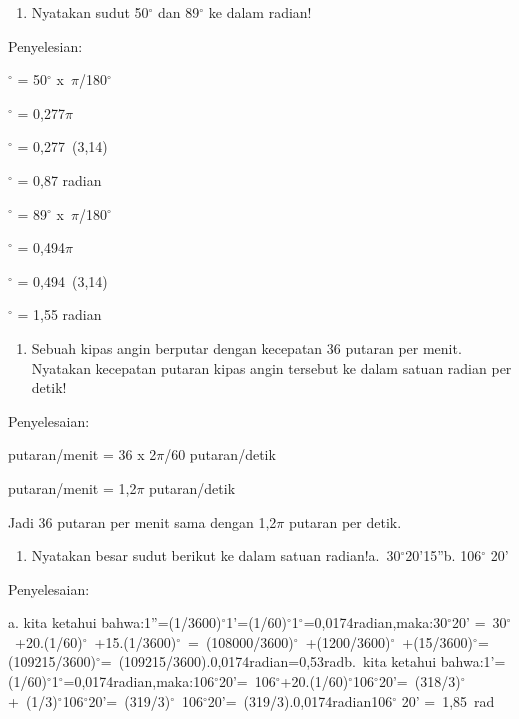 \documentclass[11pt,fleqn]{book} %
\begin{document}
\begin{myEnumerate}
\begin{itemize}
\begin{enumerate}
\item  Nyatakan sudut 50${}^\circ$ dan 89${}^\circ$ ke dalam radian!
\end{enumerate}

\noindent Penyelesian:

${}^\circ$ = 50$\mathrm{{}^\circ}$ x~$\pi$/180$\mathrm{{}^\circ}$

$\mathrm{{}^\circ}$ = 0,277$\pi$

${}^\circ$ = 0,277~(3,14)

${}^\circ$ = 0,87 radian

\noindent 

$\mathrm{{}^\circ}$ = 89$\mathrm{{}^\circ}$ x~$\pi$/180$\mathrm{{}^\circ}$

$\mathrm{{}^\circ}$ = 0,494$\pi$

${}^\circ$ = 0,494~(3,14)

${}^\circ$ = 1,55 radian

\noindent 

\begin{enumerate}
\item  Sebuah kipas angin berputar dengan kecepatan 36 putaran per menit. Nyatakan kecepatan putaran kipas angin tersebut ke dalam satuan radian per detik!
\end{enumerate}

\noindent 

\noindent Penyelesaian:

 putaran/menit = 36 x 2$\pi$/60 putaran/detik

 putaran/menit = 1,2$\pi$ putaran/detik

\noindent 

\noindent Jadi 36 putaran per menit sama dengan 1,2$\pi$ putaran per detik.

\noindent 

\begin{enumerate}
\item  Nyatakan besar sudut berikut ke dalam satuan radian!a.~30${}^\circ$20'15''b. 106${}^\circ$ 20'
\end{enumerate}

Penyelesaian:

\noindent a. kita ketahui bahwa:1''=(1/3600)${}^\circ$1'=(1/60)${}^\circ$1${}^\circ$=0,0174radian,maka:30${}^\circ$20' =~30${}^\circ$~+20.(1/60)${}^\circ$~+15.(1/3600)${}^\circ$~=~(108000/3600)${}^\circ$~+(1200/3600)${}^\circ$~+(15/3600)${}^\circ$=(109215/3600)${}^\circ$=~(109215/3600).0,0174radian=0,53radb.~kita ketahui bahwa:1'=(1/60)${}^\circ$1${}^\circ$=0,0174radian,maka:106${}^\circ$20'=~106${}^\circ$+20.(1/60)${}^\circ$106${}^\circ$20'=~(318/3)${}^\circ$+~(1/3)${}^\circ$106${}^\circ$20'=~(319/3)${}^\circ$~106${}^\circ$20'=~(319/3).0,0174radian106${}^\circ$ 20' =~1,85~rad


\end{itemize}
\end{myEnumerate}
\end{document}
